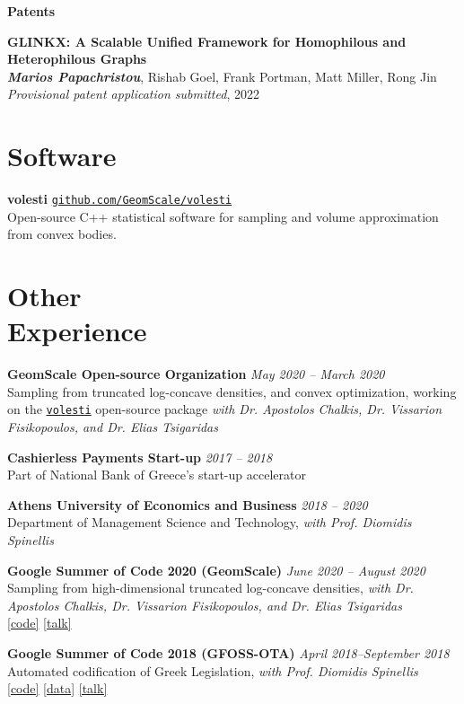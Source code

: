 \documentclass[margin]{res}
\newcommand{\field}[2]{\noindent \textbf{#1} \hfill #2 \\}
\newcommand{\specialurl}[2]{\href {#2} {{{[#1]}}}}
\newcommand{\code}[1]{\specialurl {code} {#1}}
\newcommand{\data}[1]{\specialurl {data} {#1}}
\newcommand{\talk}[1]{\specialurl {talk} {#1}}
\newcommand{\authorref}[1]{{\textit{\textbf{#1}}}}
\newcommand{\authorme}{\authorref{Marios Papachristou}}
\newcommand{\publication}[5]{\textbf{#1}\\{#2}\\\emph{#3}, {#4}\\{#5}\smallskip}
\begin{document}
\begin{resume}
\field{Patents}{}{
\begin{enumerate}[nosep, label={[P\arabic*]}]  
	\item \publication{GLINKX: A Scalable Unified Framework for Homophilous and Heterophilous Graphs}{\authorme, Rishab Goel, Frank Portman, Matt Miller, Rong Jin}{Provisional patent application submitted}{2022}{}
\end{enumerate}}

\section{Software} \field{volesti}{\href{https://github.com/GeomScale/volesti}{\texttt{github.com/GeomScale/volesti}}}{Open-source C++ statistical software for sampling and volume approximation from convex bodies.}



\section{Other \\ Experience}


\field{GeomScale Open-source Organization}{\emph{May 2020 -- March 2020}}{Sampling from truncated log-concave densities, and convex optimization, working on the \href{https://github.com/GeomScale/volesti}{\texttt{volesti}} open-source package \emph{with Dr. Apostolos Chalkis, Dr. Vissarion Fisikopoulos, and Dr. Elias Tsigaridas}}

\field{Cashierless Payments Start-up}{\emph{2017 -- 2018}}{Part of National Bank of Greece's start-up accelerator}

\field{Athens University of Economics and Business}{\emph{2018 -- 2020}}{Department of Management Science and Technology, \emph{with Prof. Diomidis Spinellis}}

\field{Google Summer of Code 2020 (GeomScale)}{\emph{June 2020 -- August 2020}}{{Sampling from high-dimensional truncated log-concave densities, \emph{with Dr. Apostolos Chalkis, Dr. Vissarion Fisikopoulos, and Dr. Elias Tsigaridas}} \\ \code{https://GeomScale/volesti} \talk{https://www.youtube.com/watch?v=P7YfC8Nn6sY}}

\field{Google Summer of Code 2018 (GFOSS-OTA)}{\emph{April 2018--September 2018}}{Automated codification of Greek Legislation, \emph{with Prof. Diomidis Spinellis} \\ \code{https://github.com/eellak/gsoc2018-3gm} \data{https://archive.org/details/greekgovernmentgazette} \talk{https://www.youtube.com/watch?v=_UIGsy85Ehw}}



\end{resume}
\end{document}
